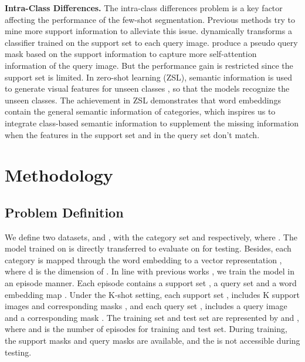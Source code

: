 \documentclass[10pt,twocolumn,letterpaper]{article}
\begin{document}
\vspace{1mm}

\noindent\textbf{Intra-Class Differences.} The intra-class differences problem is a key factor affecting the performance of the few-shot segmentation. Previous methods try to mine more support information to alleviate this issue. \cite{cwt} dynamically transforms a classifier trained on the support set to each query image. \cite{ipmt, ssp} produce a pseudo query mask based on the support information to capture more self-attention information of the query image. But the performance gain is restricted since the support set is limited. In zero-shot learning (ZSL), semantic information is used to generate visual features for unseen classes \cite{zs3net,cagnet,zsl1,zsl2, zsl3}, so that the models recognize the unseen classes. The achievement in ZSL demonstrates that word embeddings contain the general semantic information of categories, which inspires us to integrate class-based semantic information \cite{w2v, ft} to supplement the missing information when the features in the support set and in the query set don't match.



\section{Methodology}
\subsection{Problem Definition}
We define two datasets,   and , with the category set  and  respectively, where . The model trained on  is directly transferred to evaluate on  for testing. Besides, each category  is mapped through the word embedding to a vector representation , where d is the dimension of . In line with previous works \cite{pfenet}, we train the model in an episode manner. Each episode contains a support set , a query set  and a word embedding map . Under the K-shot setting, each support set , includes K support images  and corresponding masks , and each query set , includes a query image  and a corresponding mask . The training set  and test set  are represented by  and , where  and  is the number of episodes for training and test set. During training, the support masks  and query masks  are available, and the  is not accessible during testing.
\end{document}
